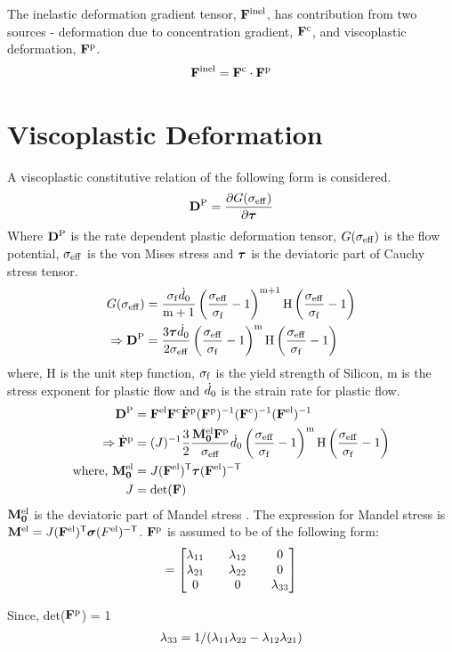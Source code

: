 \documentclass[../main.tex]{subfiles}
\begin{document}
The inelastic deformation gradient tensor, $\mathbf{F}^{{\rm{inel}}}$, has contribution from two sources - deformation due to concentration gradient, $\mathbf{F}^{\rm{c}}$, and viscoplastic deformation, $\mathbf{F}^{\rm{p}}$.
\begin{gather}
    \mathbf{F}^{\rm{inel}} = \mathbf{F}^{\rm{c}} \cdot \mathbf{F}^{\rm{p}} \label{eq:Finel_decomposition}
\end{gather}


\section{Viscoplastic Deformation}
A viscoplastic constitutive relation of the following form is considered.
\begin{gather}
\mathbf{D}^{\rm{P}} = \frac{\partial G(\sigma_{\rm{eff}})}{\partial \bm{\tau}}
\end{gather}
Where $\mathbf{D}^{\rm{P}}$ is the rate dependent plastic deformation tensor, $G(\sigma_{\rm{eff}})$ is the flow potential, $\sigma_{\rm{eff}}$ is the von Mises stress and $\bm{\tau}$ is the deviatoric part of Cauchy stress tensor.
{\color{red}{citation}}
\begin{align}
G(\sigma_{\rm{eff}}) &= \frac{\sigma_{\rm{f}} {\dot{d}}_0}{\mathrm{m}+1}\left(\frac{\sigma_{\rm{eff}}}{\sigma_{\rm{f}}}-1\right)^{\mathrm{m}+1}\mathrm{H}\left( \frac{\sigma_{\rm{eff}}}{\sigma_{\rm{f}}} - 1\right) \\
\Rightarrow \mathbf{D}^{\rm{P}} &= \frac{3 \bm{\tau} {\dot{d}}_0}{2 \sigma_{\rm{eff}}}\left(\frac{\sigma_{\rm{eff}}}{\sigma_{\rm{f}}}-1\right)^{\mathrm{m}}\mathrm{H}\left( \frac{\sigma_{\rm{eff}}}{\sigma_{\rm{f}}} - 1\right) 
\end{align}
where, H is the unit step function, $\sigma_{\rm{f}}$ is the yield strength of Silicon, m is the stress exponent for plastic flow and ${\dot{d}}_0$ is the strain rate for plastic flow.
\begin{align}
\mathbf{D}^{\rm{P}} &= \mathbf{F}^{{\rm{el}}} \mathbf{F}^{\rm{c}} \dot{\mathbf{F}}^{\rm{p}} (\mathbf{F}^{\rm{p}})^{-1} (\mathbf{F}^{\rm{c}})^{-1} (\mathbf{F}^{{\rm{el}}})^{-1}  \\
\Rightarrow \dot{\mathbf{F}}^{\rm{p}} &= (J)^{-1} \frac{3}{2} \frac{\mathbf{{M}_0^{{\rm{el}}}} \mathbf{F}^{\rm{p}}}{\sigma_{\rm{eff}}} {\dot{d}}_0 \left( \frac{\sigma_{\rm{eff}}}{\sigma_{\rm{f}}} - 1 \right)^{\rm{m}} \mathrm{H}\left( \frac{\sigma_{\rm{eff}}}{\sigma_{\rm{f}}} - 1\right)  \\
\text{where, }\mathbf{{M}_0^{{\rm{el}}}} &= J (\mathbf{F}^{\rm{el}})^{\sf {T}} \bm{\tau} (\mathbf{F}^{\rm{el}})^{-\sf {T}} \\
J &= \mathrm{det}(\mathbf{F}) 
\end{align}
$\mathbf{{M}_0^{{\rm{el}}}}$ is the deviatoric part of Mandel stress \citep{}. The expression for Mandel stress is $\mathbf{M}^{{\rm{el}}} = J (\mathbf{F}^{{\rm{el}}})^{{\sf {T}}} \bm{\sigma} (F^{{\rm{el}}})^{{-\sf {T}}}$.
$\mathbf{F}^{\rm{p}}$ is assumed to be of the following form:
\begin{gather}
    [\F^\p] = \tensor{\lambda}
\end{gather}

Since, det($\mathbf{F}^{\rm{p}}$) = 1
\begin{gather}
     \lambda_{33} = 1/(\lambda_{11} \lambda_{22} - \lambda_{12} \lambda_{21})
\end{gather}
\end{document}
